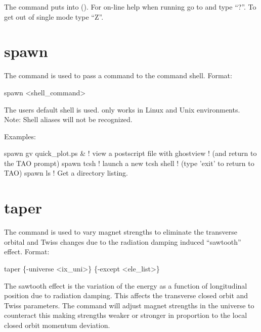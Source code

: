 {{{{{{{{{{The  command puts \tao into  ().  For on-line help
when running \tao go to  and type ``?''.  To get out of single mode type ``Z''.

\section{spawn}
\label{s:spawn}

The  command is used to pass a command to the command shell. Format:
\begin{example}
  spawn <shell_command>
\end{example}

The users default shell is used.  only works in Linux and Unix environments.
Note: Shell aliases will not be recognized.

Examples:
\begin{example}
  spawn gv quick_plot.ps &      ! view a postscript file with ghostview
                                ! (and return to the TAO prompt)
  spawn tcsh                    ! launch a new tcsh shell 
                                ! (type 'exit' to return to TAO)
  spawn ls                      ! Get a directory listing.
\end{example}


\section{taper}
\label{s:taper}

The  command is used to vary magnet strengths to eliminate the transverse orbital and Twiss
changes due to the radiation damping induced ``sawtooth'' effect. Format:
\begin{example}
  taper \{-universe <ix_uni>\} \{-except <ele_list>\}
\end{example}

The sawtooth effect is the variation of the energy as a function of longitudinal position due to
radiation damping. This affects the transverse closed orbit and Twiss parameters. The 
command will adjust magnet strengths in the  universe to counteract this making strengths
weaker or stronger in proportion to the local closed orbit momentum deviation.

}}}}}}}}}}
